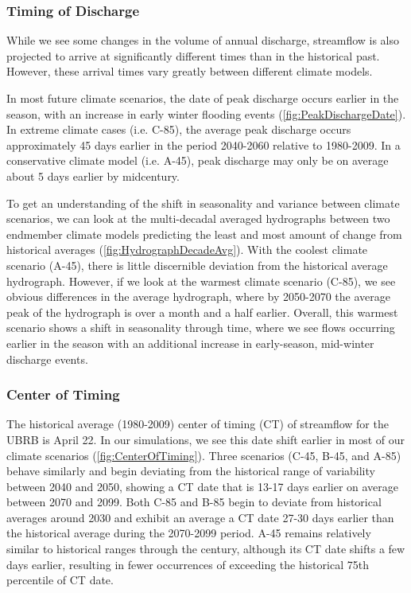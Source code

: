 \documentclass[11pt,letterpaper]{article}
\begin{document}
\subsubsection{Timing of Discharge}

While we see some changes in the volume of annual discharge, streamflow is also projected to arrive at significantly different times than in the historical past. However, these arrival times vary greatly between different climate models.

In most future climate scenarios, the date of peak discharge occurs earlier in the season, with an increase in early winter flooding events (\cref{fig:PeakDischargeDate}). In extreme climate cases (i.e. C-85), the average peak discharge occurs approximately 45 days earlier in the period 2040-2060 relative to 1980-2009. In a conservative climate model (i.e. A-45), peak discharge may only be on average about 5 days earlier by midcentury. 

To get an understanding of the shift in seasonality and variance between climate scenarios, we can look at the multi-decadal averaged hydrographs between two endmember climate models predicting the least and most amount of change from historical averages (\cref{fig:HydrographDecadeAvg}). With the coolest climate scenario (A-45), there is little discernible deviation from the historical average hydrograph. However, if we look at the warmest climate scenario (C-85), we see obvious differences in the average hydrograph, where by 2050-2070 the average peak of the hydrograph is over a month and a half earlier. Overall, this warmest scenario shows a shift in seasonality through time, where we see flows occurring earlier in the season with an additional increase in early-season, mid-winter discharge events.

\subsubsection{Center of Timing}

The historical average (1980-2009) center of timing (CT) of streamflow for the UBRB is April 22. In our simulations, we see this date shift earlier in most of our climate scenarios (\cref{fig:CenterOfTiming}). Three scenarios (C-45, B-45, and A-85) behave similarly and begin deviating from the historical range of variability between 2040 and 2050, showing a CT date that is 13-17 days earlier on average between 2070 and 2099. Both C-85 and B-85 begin to deviate from historical averages around 2030 and exhibit an average a CT date 27-30 days earlier than the historical average during the 2070-2099 period. A-45 remains relatively similar to historical ranges through the century, although its CT date shifts a few days earlier, resulting in fewer occurrences of exceeding the historical 75th percentile of CT date. 
\end{document}
